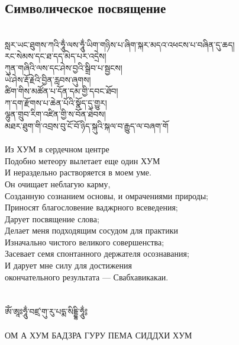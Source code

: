 \newpage
\subsection{Символическое посвящение}
\\
\ti
སླར་ཡང་ཐུགས་ཀའི་ཧཱུྂ་ལས་ཧཱུྂ་ཡིག་གཉིས་པ་ཞིག་སྐར་མདའ་འཕངས་པ་བཞིན་དུ་ཆད།\\
རང་སེམས་དང་ཐ་དད་མེད་པར་འདྲེས།\\
ཀུན་གཞིའི་ལས་དང་ཤེས་བྱའི་སྒྲིབ་པ་སྦྱངས།\\
ཡེ་ཤེས་རྡོ་རྗེའི་བྱིན་རླབས་ཞུགས།\\
ཚིག་གིས་མཚོན་པ་དོན་དམ་གྱི་དབང་ཐོབ།\\
ཀ་དག་རྫོགས་པ་ཆེན་པོའི་སྣོད་དུ་གྱུར།\\
ལྷུན་གྲུབ་རིག་འཛིན་གྱི་ས་བོན་ཐེབས།\\
མཐར་ཐུག་གི་འབྲས་བུ་ངོ་བོ་ཉིད་སྐུའི་སྐལ་བ་རྒྱུད་ལ་བཞག་གོ\\
\\
\ru
Из ХУМ в сердечном центре\\
Подобно метеору вылетает еще один ХУМ\\
И нераздельно растворяется в моем уме.\\
Он очищает неблагую карму,\\
Созданную сознанием основы, и омрачениями природы;\\
Приносят благословение ваджрного всеведения;\\
Дарует посвящение слова;\\
Делает меня подходящим сосудом для практики\\
Изначально чистого великого совершенства;\\
Засевает семя спонтанного держателя осознавания;\\
И дарует мне силу для достижения\\
окончательного результата — Свабхавикакаи.\\
\\
\\
\ti ཨོཾ་ཨཱཿཧཱུྂ་བཛྲ་གུ་རུ་པདྨ་སིདྡྷི་ཧཱུྂ༔\\
\\
\ru ОМ А ХУМ БАДЗРА ГУРУ ПЕМА СИДДХИ ХУМ\\
\\
\newpage
